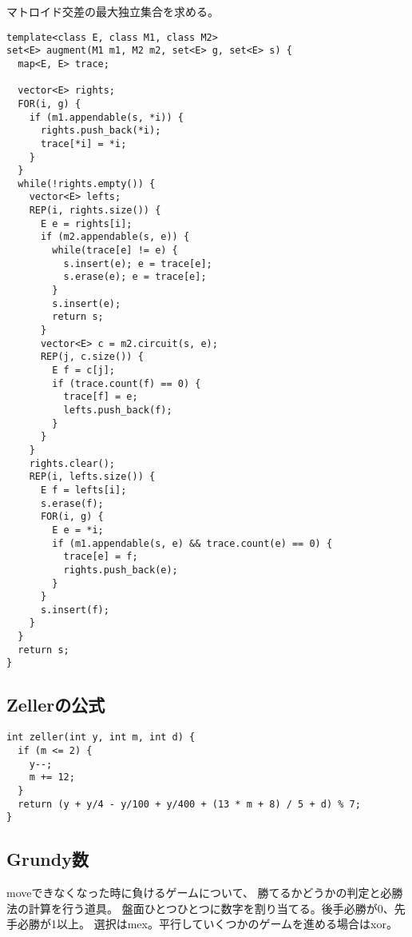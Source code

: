 マトロイド交差の最大独立集合を求める。

\begin{lstlisting}
template<class E, class M1, class M2>
set<E> augment(M1 m1, M2 m2, set<E> g, set<E> s) {
  map<E, E> trace;

  vector<E> rights;
  FOR(i, g) {
    if (m1.appendable(s, *i)) {
      rights.push_back(*i);
      trace[*i] = *i;
    }
  }
  while(!rights.empty()) {
    vector<E> lefts;
    REP(i, rights.size()) {
      E e = rights[i];
      if (m2.appendable(s, e)) {
        while(trace[e] != e) {
          s.insert(e); e = trace[e];
          s.erase(e); e = trace[e];
        }
        s.insert(e);
        return s;
      }
      vector<E> c = m2.circuit(s, e);
      REP(j, c.size()) {
        E f = c[j];
        if (trace.count(f) == 0) {
          trace[f] = e;
          lefts.push_back(f);
        }
      }
    }
    rights.clear();
    REP(i, lefts.size()) {
      E f = lefts[i];
      s.erase(f);
      FOR(i, g) {
        E e = *i;
        if (m1.appendable(s, e) && trace.count(e) == 0) {
          trace[e] = f;
          rights.push_back(e);
        }
      }
      s.insert(f);
    }
  }
  return s;
}
\end{lstlisting}



\subsection{Zellerの公式}

\begin{lstlisting}
int zeller(int y, int m, int d) {
  if (m <= 2) {
    y--;
    m += 12;
  }
  return (y + y/4 - y/100 + y/400 + (13 * m + 8) / 5 + d) % 7;
}
\end{lstlisting}


\subsection{Grundy数}

moveできなくなった時に負けるゲームについて、
勝てるかどうかの判定と必勝法の計算を行う道具。
盤面ひとつひとつに数字を割り当てる。後手必勝が0、先手必勝が1以上。
選択はmex。平行していくつかのゲームを進める場合はxor。


\newpage


